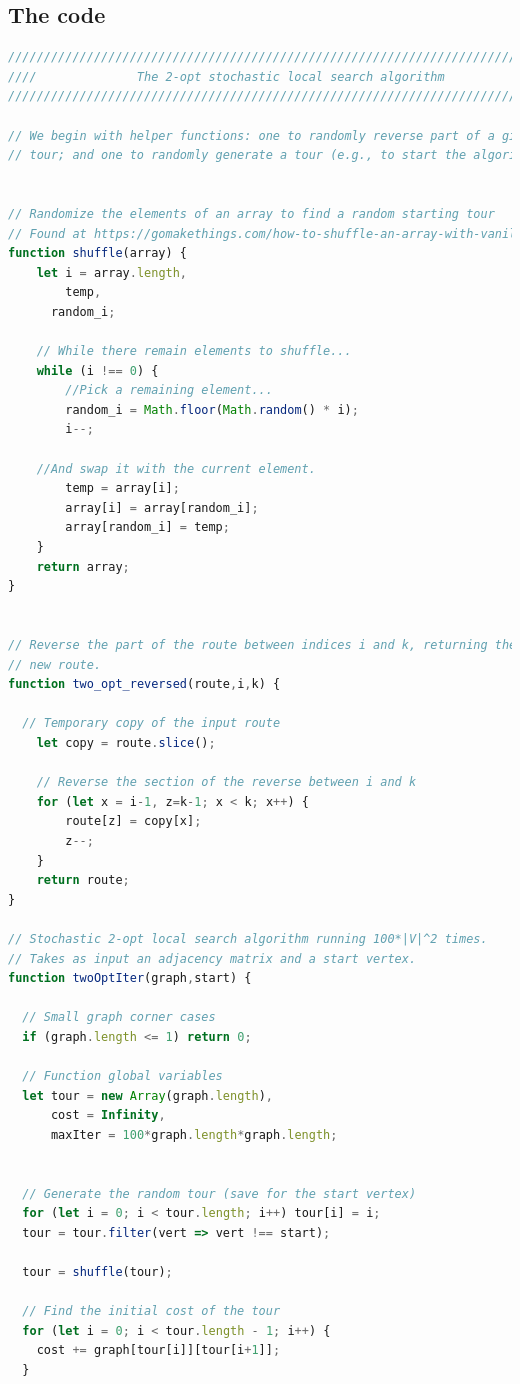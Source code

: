 \documentclass[10pt]{extarticle}
\begin{document}
\subsection{The code}
\begin{lstlisting}[language=JavaScript]
///////////////////////////////////////////////////////////////////////////////
////              The 2-opt stochastic local search algorithm              ////
///////////////////////////////////////////////////////////////////////////////

// We begin with helper functions: one to randomly reverse part of a given
// tour; and one to randomly generate a tour (e.g., to start the algorithm).


// Randomize the elements of an array to find a random starting tour
// Found at https://gomakethings.com/how-to-shuffle-an-array-with-vanilla-js/
function shuffle(array) {
	let i = array.length,
	    temp, 
      random_i;

	// While there remain elements to shuffle...
	while (i !== 0) {
		//Pick a remaining element...
		random_i = Math.floor(Math.random() * i);
		i--;
		
    //And swap it with the current element.
		temp = array[i];
		array[i] = array[random_i];
		array[random_i] = temp;
	}
	return array;
}


// Reverse the part of the route between indices i and k, returning the
// new route.
function two_opt_reversed(route,i,k) {	
	
  // Temporary copy of the input route  
	let copy = route.slice();

	// Reverse the section of the reverse between i and k
	for (let x = i-1, z=k-1; x < k; x++) {	
		route[z] = copy[x];
		z--;
	}		
	return route;	
}

// Stochastic 2-opt local search algorithm running 100*|V|^2 times.
// Takes as input an adjacency matrix and a start vertex.
function twoOptIter(graph,start) {

  // Small graph corner cases
  if (graph.length <= 1) return 0;

  // Function global variables
  let tour = new Array(graph.length),
      cost = Infinity,
      maxIter = 100*graph.length*graph.length;


  // Generate the random tour (save for the start vertex)
  for (let i = 0; i < tour.length; i++) tour[i] = i;
  tour = tour.filter(vert => vert !== start);

  tour = shuffle(tour);

  // Find the initial cost of the tour
  for (let i = 0; i < tour.length - 1; i++) {
    cost += graph[tour[i]][tour[i+1]];
  }
  

\end{lstlisting}
\end{document}
